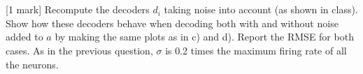 \documentclass{article}
\begin{document}
    \begin{center}
    \end{center}
    { \hspace*{\fill} \\}
    
    \begin{center}
    \end{center}
    { \hspace*{\fill} \\}
    
    {[}1 mark{]} Recompute the decoders $d_i$ taking noise into account (as
shown in class). Show how these decoders behave when decoding both with
and without noise added to $a$ by making the same plots as in c) and d).
Report the RMSE for both cases. As in the previous question, $\sigma$ is
0.2 times the maximum firing rate of all the neurons.
\end{document}
